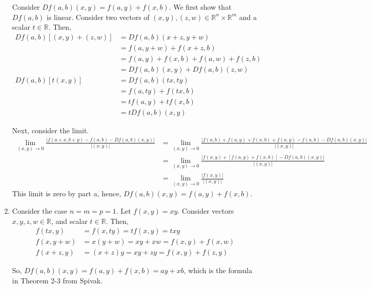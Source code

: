 \documentclass{exam}
\numberwithin{equation}{section}
\newcommand{\R}{\mathbb{R}}
\begin{document}
\begin{enumerate}[label=(\alph*)]
        Consider $Df(a,b)(x,y)=f(a,y)+f(x,b)$. We first show that $Df(a,b)$ is linear. Consider two vectors of $(x,y), (z,w)\in\R^n\times\R^m$ and a scalar $t\in\R$. Then,
        \begin{align*}
            Df(a,b)[(x,y)+(z,w)]&=Df(a,b)(x+z,y+w)\\
            &=f(a,y+w)+f(x+z,b)\\
            &=f(a,y)+f(x,b)+f(a,w)+f(z,b)\\
            &=Df(a,b)(x,y)+Df(a,b)(z,w)\\
            Df(a,b)[t(x,y)]&=Df(a,b)(tx,ty)\\
            &=f(a,ty)+f(tx,b)\\
            &=tf(a,y)+tf(x,b)\\
            &=tDf(a,b)(x,y)
        \end{align*}

        Next, consider the limit. 
        \begin{align*}
            \lim_{(x,y)\to 0}\frac{|f(a+x,b+y)-f(a,b)-Df(a,b)(x,y)|}{|(x,y)|}&=\lim_{(x,y)\to 0}\frac{|f(a,b)+f(a,y)+f(x,b)+f(x,y)-f(a,b)-Df(a,b)(x,y)|}{|(x,y)|}\\
            &=\lim_{(x,y)\to 0}\frac{|f(x,y)+[f(a,y)+f(x,b)]-Df(a,b)(x,y)|}{|(x,y)|}\\
            &=\lim_{(x,y)\to 0}\frac{|f(x,y)|}{|(x,y)|}
        \end{align*}
        This limit is zero by part a, hence, $Df(a,b)(x,y)=f(a,y)+f(x,b)$.

        \item Consider the case $n=m=p=1$. Let $f(x,y)=xy$. Consider vectors $x,y,z,w\in\R$, and scalar $t\in\R$. Then,
        \begin{align*}
            f(tx,y)&=f(x,ty)=tf(x,y)=txy\\
            f(x,y+w)&=x(y+w)=xy+xw=f(x,y)+f(x,w)\\
            f(x+z,y)&=(x+z)y=xy+zy=f(x,y)+f(z,y)
        \end{align*}

        So, $Df(a,b)(x,y)=f(a,y)+f(x,b)=ay+xb$, which is the formula in Theorem 2-3 from Spivak.
    \end{enumerate}
\end{document}
